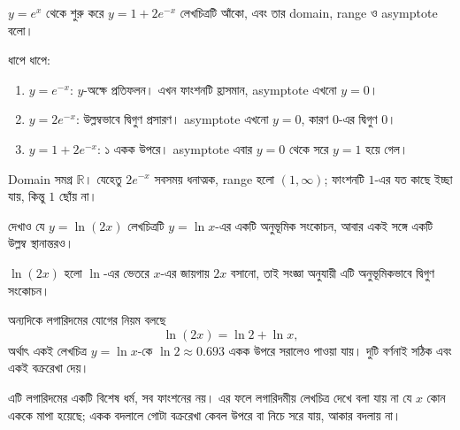 \documentclass[11pt]{article}
\begin{document}
\begin{example}
$y = e^{x}$ থেকে শুরু করে $y = 1 + 2e^{-x}$ লেখচিত্রটি আঁকো, এবং তার domain,
range ও asymptote বলো।
\end{example}

\begin{solbox}
ধাপে ধাপে:
\begin{enumerate}
  \item $y = e^{-x}$: $y$-অক্ষে প্রতিফলন। এখন ফাংশনটি হ্রাসমান, asymptote এখনো
        $y = 0$।
  \item $y = 2e^{-x}$: উল্লম্বভাবে দ্বিগুণ প্রসারণ। asymptote এখনো $y = 0$,
        কারণ $0$-এর দ্বিগুণ $0$।
  \item $y = 1 + 2e^{-x}$: ১ একক উপরে। asymptote এবার $y = 0$ থেকে সরে
        $y = 1$ হয়ে গেল।
\end{enumerate}
Domain সমগ্র $\mathbb{R}$। যেহেতু $2e^{-x}$ সবসময় ধনাত্মক, range হলো
$(1, \infty)$; ফাংশনটি $1$-এর যত কাছে ইচ্ছা যায়, কিন্তু $1$ ছোঁয় না।

\begin{center}
\end{center}
\end{solbox}

\begin{example}
দেখাও যে $y = \ln (2x)$ লেখচিত্রটি $y = \ln x$-এর একটি অনুভূমিক সংকোচন, আবার
একই সঙ্গে একটি উল্লম্ব স্থানান্তরও।
\end{example}

\begin{solbox}
$\ln(2x)$ হলো $\ln$-এর ভেতরে $x$-এর জায়গায় $2x$ বসানো, তাই সংজ্ঞা অনুযায়ী এটি
অনুভূমিকভাবে দ্বিগুণ সংকোচন।

অন্যদিকে লগারিদমের যোগের নিয়ম বলছে
\[
  \ln (2x) = \ln 2 + \ln x ,
\]
অর্থাৎ একই লেখচিত্র $y = \ln x$-কে $\ln 2 \approx 0.693$ একক উপরে সরালেও পাওয়া
যায়। দুটি বর্ণনাই সঠিক এবং একই বক্ররেখা দেয়।

এটি লগারিদমের একটি বিশেষ ধর্ম, সব ফাংশনের নয়। এর ফলে লগারিদমীয় লেখচিত্র দেখে
বলা যায় না যে $x$ কোন এককে মাপা হয়েছে; একক বদলালে গোটা বক্ররেখা কেবল উপরে বা
নিচে সরে যায়, আকার বদলায় না।
\end{solbox}
\end{document}
